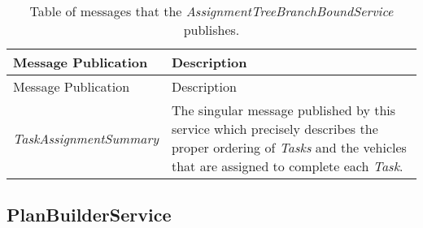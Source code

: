 \begin{longtable}[c]{@{}ll@{}}
\caption{Table of messages that the
\emph{AssignmentTreeBranchBoundService} publishes.}\tabularnewline
\toprule
\begin{minipage}[b]{0.29\columnwidth}\raggedright\strut
Message Publication
\strut\end{minipage} &
\begin{minipage}[b]{0.65\columnwidth}\raggedright\strut
Description
\strut\end{minipage}\tabularnewline
\midrule
\endfirsthead
\toprule
\begin{minipage}[b]{0.29\columnwidth}\raggedright\strut
Message Publication
\strut\end{minipage} &
\begin{minipage}[b]{0.65\columnwidth}\raggedright\strut
Description
\strut\end{minipage}\tabularnewline
\midrule
\endhead
\begin{minipage}[t]{0.29\columnwidth}\raggedright\strut
\emph{TaskAssignmentSummary}
\strut\end{minipage} &
\begin{minipage}[t]{0.65\columnwidth}\raggedright\strut
The singular message published by this service which precisely describes
the proper ordering of \emph{Tasks} and the vehicles that are assigned
to complete each \emph{Task}.
\strut\end{minipage}\tabularnewline
\bottomrule
\end{longtable}

\subsection{PlanBuilderService}\label{planbuilderservice}
